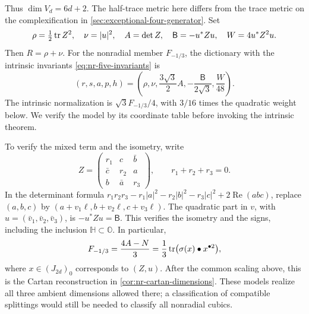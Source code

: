 Thus \(\dim V_d=6d+2\). The half-trace metric here differs from the
trace metric on the complexification in
\cref{sec:exceptional-four-generator}. Set
\begin{equation}\label{eq:nonradial-invariants}
 \rho=\tfrac12\operatorname{tr} Z^2,\quad \nu=|u|^2,\quad
 A=\det Z,\quad \mathsf{B}=-u^*Zu,\quad W=4u^*Z^2u.
\end{equation}
Then \(R=\rho+\nu\). For the nonradial member \(F_{-1/3}\), the
dictionary with the intrinsic invariants
\eqref{eq:nr-five-invariants} is
\[
 (r,s,a,p,h)=\left(\rho,\nu,\frac{3\sqrt3}{2}A,
             -\frac{\mathsf B}{2\sqrt3},\frac W{48}\right).
\]
The intrinsic normalization is \(\sqrt3 F_{-1/3}/4\), with
\(3/16\) times the quadratic weight below. We verify the model
by its coordinate table before invoking the intrinsic theorem.

To verify the mixed term and the isometry, write
\[
 Z=\begin{pmatrix}r_1&c&\bar b\\ \bar c&r_2&a\\ b&\bar a&r_3\end{pmatrix},
 \qquad r_1+r_2+r_3=0.
\]
In the determinant formula
\(r_1r_2r_3-r_1|a|^2-r_2|b|^2-r_3|c|^2+2\operatorname{Re}(abc)\),
replace \((a,b,c)\) by
\((a+v_1\ell,b+v_2\ell,c+v_3\ell)\). The quadratic part in
\(v\), with \(u=(\bar v_1,\bar v_2,\bar v_3)\), is
\(-u^*Zu=\mathsf{B}\). This verifies the isometry and the signs, including
the inclusion \(\mathbb H\subset\mathbb O\). In particular,
\[
 F_{-1/3}=\frac{4A-N}{3}
   =\frac13\operatorname{tr}\bigl(\sigma(x)\bullet x^{\bullet2}\bigr),
\]
where \(x\in(J_{2d})_0\) corresponds to \((Z,u)\).
After the common scaling above, this is the Cartan reconstruction in
\cref{cor:nr-cartan-dimensions}. These models realize all three ambient
dimensions allowed there; a classification of compatible splittings
would still be needed to classify all nonradial cubics.

